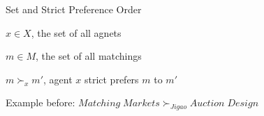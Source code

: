 \documentclass{beamer}
\begin{document}
\begin{frame}{Set and Strict Preference Order}
	\begin{description}[leftmargin=!,labelwidth=\widthof{\bfseries strict preference order}]
		\item [\emph{Agent}]$x \in X$, the set of all agnets
		\item [\emph{Matching}] $m \in M$, the set of all matchings
		\item [\emph{Strict Preference Order}] $m \succ_x m'$, agent $x$ strict prefers $m$ to $m'$
	\end{description}
	\begin{center}
		Example before: $Matching \;Markets \succ_{Jigao} Auction \;Design$
	\end{center}
\end{frame}

\end{document}
